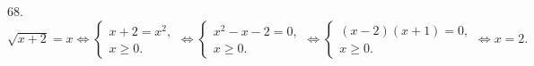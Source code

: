 68. $\sqrt{x+2}=x\Leftrightarrow\begin{cases}x+2=x^2,\\x\geqslant0.\end{cases}\Leftrightarrow\begin{cases}x^2-x-2=0,\\x\geqslant0.\end{cases}
\Leftrightarrow\begin{cases}(x-2)(x+1)=0,\\x\geqslant0.\end{cases}\Leftrightarrow x=2.$\\
